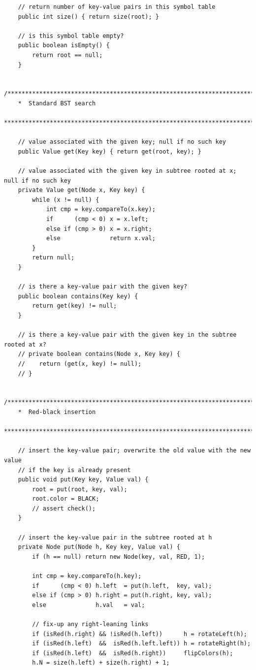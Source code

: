 \documentclass{article}
\begin{document}
\begin{lstlisting}
    // return number of key-value pairs in this symbol table
    public int size() { return size(root); }

    // is this symbol table empty?
    public boolean isEmpty() {
        return root == null;
    }

   /*************************************************************************
    *  Standard BST search
    *************************************************************************/

    // value associated with the given key; null if no such key
    public Value get(Key key) { return get(root, key); }

    // value associated with the given key in subtree rooted at x; null if no such key
    private Value get(Node x, Key key) {
        while (x != null) {
            int cmp = key.compareTo(x.key);
            if      (cmp < 0) x = x.left;
            else if (cmp > 0) x = x.right;
            else              return x.val;
        }
        return null;
    }

    // is there a key-value pair with the given key?
    public boolean contains(Key key) {
        return get(key) != null;
    }

    // is there a key-value pair with the given key in the subtree rooted at x?
    // private boolean contains(Node x, Key key) {
    //    return (get(x, key) != null);
    // }

   /*************************************************************************
    *  Red-black insertion
    *************************************************************************/

    // insert the key-value pair; overwrite the old value with the new value
    // if the key is already present
    public void put(Key key, Value val) {
        root = put(root, key, val);
        root.color = BLACK;
        // assert check();
    }

    // insert the key-value pair in the subtree rooted at h
    private Node put(Node h, Key key, Value val) { 
        if (h == null) return new Node(key, val, RED, 1);

        int cmp = key.compareTo(h.key);
        if      (cmp < 0) h.left  = put(h.left,  key, val); 
        else if (cmp > 0) h.right = put(h.right, key, val); 
        else              h.val   = val;

        // fix-up any right-leaning links
        if (isRed(h.right) && !isRed(h.left))      h = rotateLeft(h);
        if (isRed(h.left)  &&  isRed(h.left.left)) h = rotateRight(h);
        if (isRed(h.left)  &&  isRed(h.right))     flipColors(h);
        h.N = size(h.left) + size(h.right) + 1;


\end{lstlisting}
\end{document}
